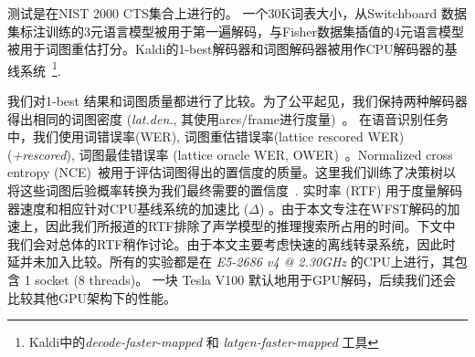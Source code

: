 测试是在NIST 2000 CTS集合上进行的。
一个30K词表大小，从Switchboard 数据集标注训练的3元语言模型被用于第一遍解码，与Fisher数据集插值的4元语言模型被用于词图重估打分。Kaldi的1-best解码器和词图解码器被用作CPU解码器的基线系统~\footnote{Kaldi中的{\em{decode-faster-mapped}} 和 {\em{latgen-faster-mapped}} 工具}.


我们对1-best 结果和词图质量都进行了比较。为了公平起见，我们保持两种解码器得出相同的词图密度 ({\em{lat.den.}}, 其使用arcs/frame进行度量)~\cite{woodland19951994}。
在语音识别任务中，我们使用词错误率(WER), 词图重估错误率(lattice rescored WER) ({\em{+rescored}}), 词图最佳错误率 (lattice oracle WER, OWER)~\cite{hoffmeister2006frame}。Normalized cross entropy (NCE)~\cite{siu1999evaluation}被用于评估词图得出的置信度的质量。这里我们训练了决策树以将这些词图后验概率转换为我们最终需要的置信度~\cite{chen2017confidence,chen2017unified}.
实时率 (RTF) 用于度量解码器速度和相应针对CPU基线系统的加速比 ($\Delta$) 。由于本文专注在WFST解码的加速上，因此我们所报道的RTF排除了声学模型的推理搜索所占用的时间。下文中我们会对总体的RTF稍作讨论。由于本文主要考虑快速的离线转录系统，因此时延并未加入比较。所有的实验都是在  {\em{E5-2686 v4 @ 2.30GHz}} 的CPU上进行，其包含 1 socket (8 threads)。 %
一块 Tesla V100 默认地用于GPU解码，后续我们还会比较其他GPU架构下的性能。



